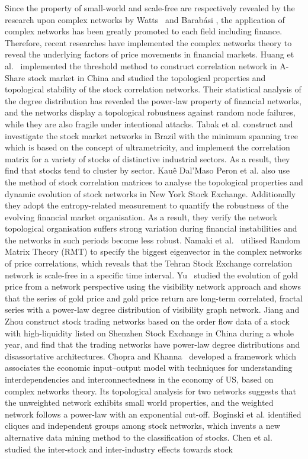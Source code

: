 Since the property of small-world and scale-free are respectively revealed by the research upon complex networks by Watts~\cite{watts1998collective} and Barab{\'a}si \cite{barabasi1999emergence}, the application of complex networks has been greatly promoted to each field including finance. Therefore, recent researches have implemented the complex networks theory to reveal the underlying factors of price movements in financial markets. Huang et al.~\cite{chinesenetwork} implemented the threshold method to construct correlation network in A-Share stock market in China and studied the topological properties and topological stability of the stock correlation networks. Their statistical analysis of the degree distribution has revealed the power-law property of financial networks, and the networks display a topological robustness against random node failures, while they are also fragile under intentional attacks. Tabak et al. \cite{tabak2010topological} construct and investigate the stock market networks in Brazil with the minimum spanning tree which is based on the concept of ultrametricity, and implement the correlation matrix for a variety of stocks of distinctive industrial sectors. As a result, they find that stocks tend to cluster by sector. Kau{\^e} Dal’Maso Peron et al. \cite{kaue2012structure} also use the method of stock correlation matrices to analyse the topological properties and dynamic evolution of stock networks in New York Stock Exchange. Additionally they adopt the entropy-related measurement to quantify the robustness of the evolving financial market organisation. As a result, they verify the network topological organisation suffers strong variation during financial instabilities and the networks in such periods become less robust. Namaki et al.~\cite{genuine} utilised Random Matrix Theory (RMT) to specify the biggest eigenvector in the complex networks of price correlations, which reveals that the Tehran Stock Exchange correlation network is scale-free in a specific time interval. Yu~\cite{visibility} studied the evolution of gold price from a network perspective using the visibility network approach and shows that the series of gold price and gold price return are long-term correlated, fractal series with a power-law degree distribution of visibility graph network. Jiang and Zhou \cite{jiang2010complex} construct stock trading networks based on the order flow data of a stock with high-liquidity listed on Shenzhen Stock Exchange in China during a whole year, and find that the trading networks have power-law degree distributions and disassortative architectures. Chopra and Khanna~\cite{intercd} developed a framework which associates the economic input–output model with techniques for understanding interdependencies and interconnectedness in the economy of US, based on complex networks theory. Its topological analysis for two networks suggests that the unweighted network exhibits small world properties, and the weighted network follows a power-law with an exponential cut-off. Boginski et al. \cite{statisticalanalysis} identified cliques and independent groups among stock networks, which  invents a new alternative data mining method to the classification of stocks. Chen et al.~\cite{CHEN2015224} studied the inter-stock and inter-industry effects towards stock 